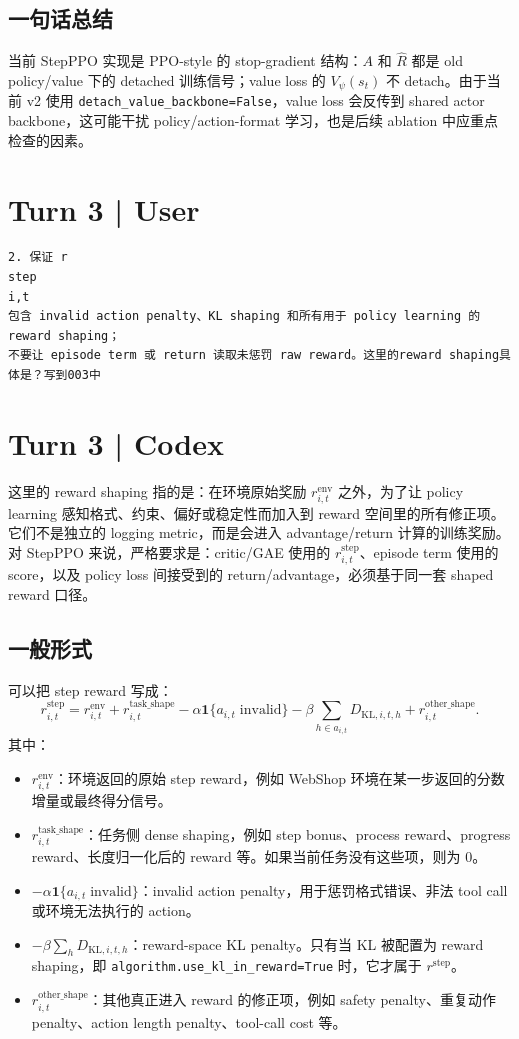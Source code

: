 \documentclass[10pt]{ctexart}
\newcommand{\code}[1]{\texttt{#1}}
\begin{document}
\subsection*{一句话总结}
当前 StepPPO 实现是 PPO-style 的 stop-gradient 结构：\(A\) 和 \(\hat R\) 都是 old policy/value 下的 detached 训练信号；value loss 的 \(V_{\psi}(s_t)\) 不 detach。由于当前 v2 使用 \code{detach\_value\_backbone=False}，value loss 会反传到 shared actor backbone，这可能干扰 policy/action-format 学习，也是后续 ablation 中应重点检查的因素。

\section*{Turn 3 | User}
\begin{Verbatim}[breaklines=true,breakanywhere=true]
2. 保证 r
step
i,t
包含 invalid action penalty、KL shaping 和所有用于 policy learning 的 reward shaping；
不要让 episode term 或 return 读取未惩罚 raw reward。这里的reward shaping具体是？写到003中
\end{Verbatim}

\section*{Turn 3 | Codex}
这里的 reward shaping 指的是：在环境原始奖励 \(r^{\mathrm{env}}_{i,t}\) 之外，为了让 policy learning 感知格式、约束、偏好或稳定性而加入到 reward 空间里的所有修正项。它们不是独立的 logging metric，而是会进入 advantage/return 计算的训练奖励。对 StepPPO 来说，严格要求是：critic/GAE 使用的 \(r^{\mathrm{step}}_{i,t}\)、episode term 使用的 score，以及 policy loss 间接受到的 return/advantage，必须基于同一套 shaped reward 口径。

\subsection*{一般形式}
可以把 step reward 写成：
\[
r^{\mathrm{step}}_{i,t}
= r^{\mathrm{env}}_{i,t}
+ r^{\mathrm{task\_shape}}_{i,t}
- \alpha\mathbf{1}\{a_{i,t}\;\text{invalid}\}
- \beta\sum_{h\in a_{i,t}}D_{\mathrm{KL},i,t,h}
+ r^{\mathrm{other\_shape}}_{i,t}.
\]
其中：
\begin{itemize}
  \item \(r^{\mathrm{env}}_{i,t}\)：环境返回的原始 step reward，例如 WebShop 环境在某一步返回的分数增量或最终得分信号。
  \item \(r^{\mathrm{task\_shape}}_{i,t}\)：任务侧 dense shaping，例如 step bonus、process reward、progress reward、长度归一化后的 reward 等。如果当前任务没有这些项，则为 0。
  \item \(-\alpha\mathbf{1}\{a_{i,t}\;\text{invalid}\}\)：invalid action penalty，用于惩罚格式错误、非法 tool call 或环境无法执行的 action。
  \item \(-\beta\sum_h D_{\mathrm{KL},i,t,h}\)：reward-space KL penalty。只有当 KL 被配置为 reward shaping，即 \code{algorithm.use\_kl\_in\_reward=True} 时，它才属于 \(r^{\mathrm{step}}\)。
  \item \(r^{\mathrm{other\_shape}}_{i,t}\)：其他真正进入 reward 的修正项，例如 safety penalty、重复动作 penalty、action length penalty、tool-call cost 等。
\end{itemize}
\end{document}
